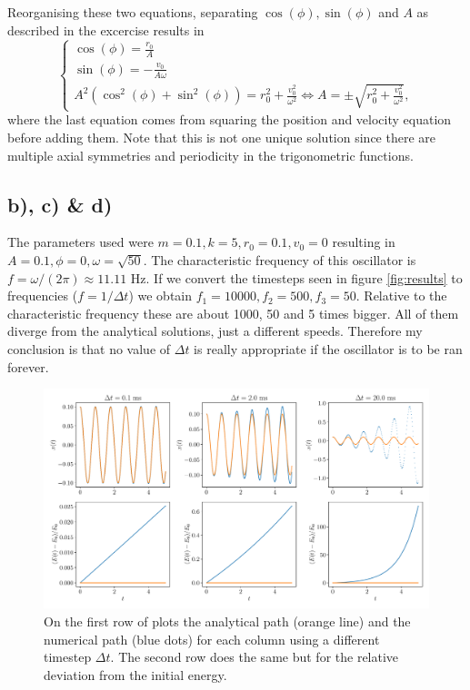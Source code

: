 \documentclass[a4paper, 12pt]{article}
\begin{document}
Reorganising these two equations, separating $\cos(\phi), \sin(\phi)$ and $A$ as described in the excercise results in
\begin{equation}
    \begin{cases}
        \cos(\phi) = \frac{r_0}{A} \\
        \sin(\phi) = -\frac{v_0}{A \omega} \\
        A^2(\cos^2(\phi) + \sin^2(\phi)) = r_0^2 + \frac{v_0^2}{\omega^2} \iff A = \pm \sqrt{r_0^2 + \frac{v_0^2}{\omega^2}},
    \end{cases}
\end{equation}
where the last equation comes from squaring the position and velocity equation before adding them. Note that this is not one unique solution since there are multiple axial symmetries and periodicity in the trigonometric functions.

\subsection*{b), c) \& d)}
The parameters used were $m=0.1, k=5, r_0=0.1, v_0=0$ resulting in $A=0.1,\phi=0,\omega=\sqrt{50}$. The characteristic frequency of this oscillator is $f=\omega/(2\pi) \approx 11.11$ Hz. If we convert the timesteps seen in figure \ref{fig:results} to frequencies ($f=1/\Delta t$) we obtain $f_1 = 10000, f_2 = 500, f_3 = 50$. Relative to the characteristic frequency these are about 1000, 50 and 5 times bigger. All of them diverge from the analytical solutions, just a different speeds. Therefore my conclusion is that no value of $\Delta t$ is really appropriate if the oscillator is to be ran forever.

\begin{figure}[h!]
    \includegraphics[width=\textwidth]{../Harmonic-Oscillator/figures/euler_forward.pdf}
    \caption{On the first row of plots the analytical path (orange line) and the numerical path (blue dots) for each column using a different timestep $\Delta t$. The second row does the same but for the relative deviation from the initial energy.}
    \label{fig:euler_results}
\end{figure}
\end{document}
